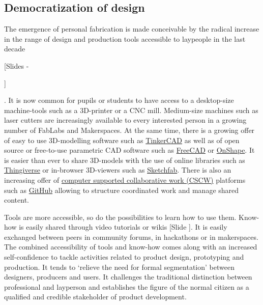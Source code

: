 \documentclass{article}
\newcounter{slide}
\begin{document}
\subsection{Democratization of design}
\label{sec:democratizationofdesign}
The emergence of personal fabrication is made conceivable by the radical increase in the range of design and production tools accessible to laypeople in the last decade {\color{blue}[Slides -\addtocounter{slide}{5}]}. It is now common for pupils or students to have access to a desktop-size machine-tools such as a 3D-printer or a CNC mill. Medium-size machines such as laser cutters are increasingly available to every interested person in a growing number of FabLabs and Makerspaces. At the same time, there is a growing offer of easy to use 3D-modelling software such as \href{https://www.tinkercad.com/}{TinkerCAD} as well as of open source or free-to-use parametric CAD software such as \href{https://www.freecadweb.org/}{FreeCAD} or \href{https://www.onshape.com/}{OnShape}. It is easier than ever to share 3D-models with the use of online libraries such as \href{https://www.thingiverse.com/}{Thingiverse} or in-browser 3D-viewers such as \href{https://sketchfab.com/}{Sketchfab}. There is also an increasing offer of \href{https://en.wikipedia.org/wiki/Computer-supported_cooperative_work}{computer supported collaborative work (CSCW)} platforms such as \href{https://github.com/}{GitHub} allowing to structure coordinated work and manage shared content. 

Tools are more accessible, so do the possibilities to learn how to use them. Know-how is easily shared through video tutorials or wikis {\color{blue}[Slide ]}. It is easily exchanged between peers in community forums, in hackathons or in makerspaces. The combined accessibility of tools and know-how comes along with an increased self-confidence to tackle activities related to product design, prototyping and production. It tends to `relieve the need for formal segmentation' \cite{chenDirectDigitalManufacturing2015a} between designers, producers and users. It challenges the traditional distinction between professional and layperson and establishes the figure of the normal citizen as a qualified and credible stakeholder of product development.
\end{document}
